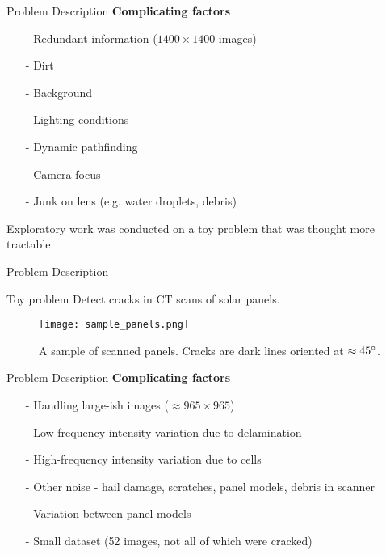\documentclass[10pt]{beamer}
\begin{document}
\begin{frame}[fragile]{Problem Description}
	\textbf{Complicating factors}
	\begin{itemize}
		\item[-] Redundant information ($1400 \times 1400$ images)
		\item[-] Dirt
		\item[-] Background
		\item[-] Lighting conditions
		\item[-] Dynamic pathfinding
		\item[-] Camera focus
		\item[-] Junk on lens (e.g. water droplets, debris)
	\end{itemize}
	
	Exploratory work was conducted on a toy problem that was thought more tractable.
\end{frame}


\begin{frame}[fragile]{Problem Description}
	\begin{alertblock}{Toy problem}
	 Detect cracks in CT scans of solar panels.
	\end{alertblock}
	\begin{figure}
		\texttt{[image: sample\_panels.png]}
		\caption{A sample of scanned panels. Cracks are dark lines oriented at $\approx 45\degree$.}
	\end{figure}
\end{frame}

\begin{frame}[fragile]{Problem Description}
	\textbf{Complicating factors}
	\begin{itemize}
		\item[-] Handling large-ish images ($\approx 965 \times 965$)
		\item[-] Low-frequency intensity variation due to delamination
		\item[-] High-frequency intensity variation due to cells
		\item[-] Other noise - hail damage, scratches, panel models, debris in scanner
		\item[-] Variation between panel models
		\item[-] Small dataset (52 images, not all of which were cracked)
	\end{itemize}
\end{frame}
\end{document}
